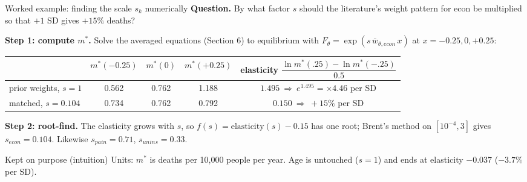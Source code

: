 ﻿\documentclass[9pt,aspectratio=169]{beamer}
\newenvironment{kept}{\begin{exampleblock}{Kept on purpose (intuition)}\small}{\end{exampleblock}}
\begin{document}
\begin{frame}{Worked example: finding the scale $s_k$ numerically}
 \textbf{Question.} By what factor $s$ should the literature's weight pattern for econ be multiplied so that $+1$ SD gives $+15\%$ deaths?
 \par\smallskip
 \textbf{Step 1: compute $m^\ast$.} Solve the averaged equations (Section 6) to equilibrium with $F_\theta=\exp(s\,\bar w_{\theta,econ}\,x)$ at $x=-0.25,0,+0.25$:
 \par\smallskip
 \centering\footnotesize\renewcommand{\arraystretch}{1.15}
 \begin{tabular}{l ccc c}
 \toprule & $m^\ast(-0.25)$ & $m^\ast(0)$ & $m^\ast(+0.25)$ & elasticity $\dfrac{\ln m^\ast(.25)-\ln m^\ast(-.25)}{0.5}$\\\midrule
 prior weights, $s=1$ & 0.562 & 0.762 & 1.188 & $1.495\ \Rightarrow\ e^{1.495}=\times4.46$ per SD\\
 matched, $s=0.104$ & 0.734 & 0.762 & 0.792 & $0.150\ \Rightarrow\ +15\%$ per SD\\\bottomrule
 \end{tabular}
 \par\smallskip\raggedright\normalsize
 \textbf{Step 2: root-find.} The elasticity grows with $s$, so $f(s)=\text{elasticity}(s)-0.15$ has one root; Brent's method on $[10^{-4},3]$ gives $s_{econ}=0.104$. Likewise $s_{pain}=0.71$, $s_{unins}=0.33$.
 \begin{kept}
  Units: $m^\ast$ is deaths per 10{,}000 people per year. Age is untouched ($s=1$) and ends at elasticity $-0.037$ ($-3.7\%$ per SD).
 \end{kept}
\end{frame}
\end{document}
